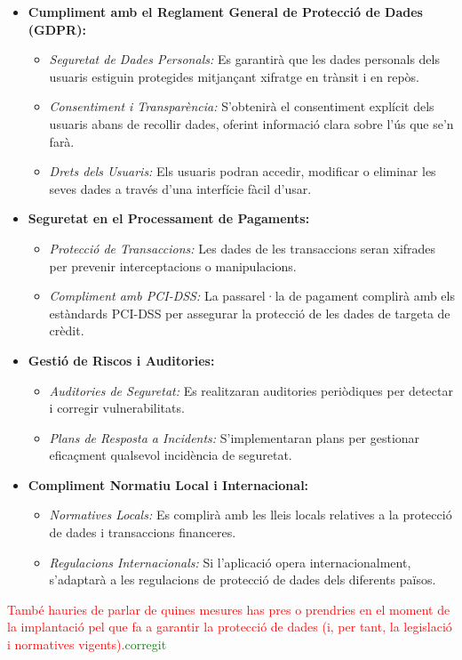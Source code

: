 \documentclass[a4paper,12pt,twoside]{ThesisStyle}
\newcommand{\pau}[1]{\textcolor{red}{#1}}
\newcommand{\sudan}[1]{\textcolor{green}{#1}}
\begin{document}
\begin{itemize}
  \item \textbf{Cumpliment amb el Reglament General de Protecció de Dades (GDPR):}
    \begin{itemize}
      \item \textit{Seguretat de Dades Personals:} Es garantirà que les dades personals dels usuaris estiguin protegides mitjançant xifratge en trànsit i en repòs.
      \item \textit{Consentiment i Transparència:} S'obtenirà el consentiment explícit dels usuaris abans de recollir dades, oferint informació clara sobre l'ús que se'n farà.
      \item \textit{Drets dels Usuaris:} Els usuaris podran accedir, modificar o eliminar les seves dades a través d'una interfície fàcil d'usar.
    \end{itemize}
  
  \item \textbf{Seguretat en el Processament de Pagaments:}
    \begin{itemize}
      \item \textit{Protecció de Transaccions:} Les dades de les transaccions seran xifrades per prevenir interceptacions o manipulacions.
      \item \textit{Compliment amb PCI-DSS:} La passarel·la de pagament complirà amb els estàndards PCI-DSS per assegurar la protecció de les dades de targeta de crèdit.
    \end{itemize}
  
  \item \textbf{Gestió de Riscos i Auditories:}
    \begin{itemize}
      \item \textit{Auditories de Seguretat:} Es realitzaran auditories periòdiques per detectar i corregir vulnerabilitats.
      \item \textit{Plans de Resposta a Incidents:} S'implementaran plans per gestionar eficaçment qualsevol incidència de seguretat.
    \end{itemize}
  
  \item \textbf{Compliment Normatiu Local i Internacional:}
    \begin{itemize}
      \item \textit{Normatives Locals:} Es complirà amb les lleis locals relatives a la protecció de dades i transaccions financeres.
      \item \textit{Regulacions Internacionals:} Si l'aplicació opera internacionalment, s'adaptarà a les regulacions de protecció de dades dels diferents països.
    \end{itemize}
\end{itemize}
\pau{També hauries de parlar de quines mesures has pres o prendries en el moment de la implantació pel que fa a garantir la protecció de dades (i, per tant, la legislació i normatives vigents).}\sudan{corregit}
\end{document}
